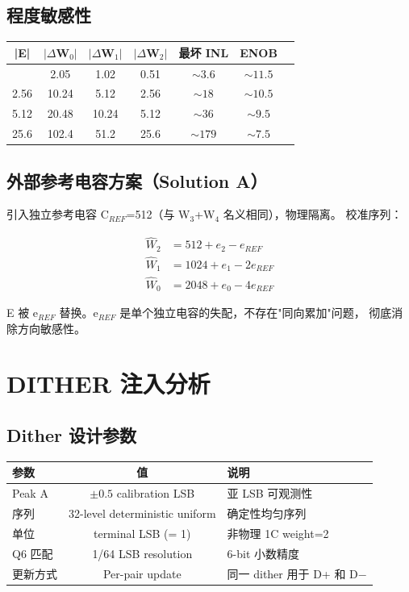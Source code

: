\documentclass[UTF8,a4paper,12pt]{ctexart}
\theoremstyle{definition}
\begin{document}
\subsection{程度敏感性}

\begin{longtable}{ccccccc}
\toprule
\textbf{|E|} & \textbf{$|\Delta$W$_0|$} & \textbf{$|\Delta$W$_1|$} & \textbf{$|\Delta$W$_2|$} & \textbf{最坏 INL} & \textbf{ENOB} \\
\midrule
\endhead
\bottomrule
\endfoot
0.512 & 2.05 & 1.02 & 0.51 & $\sim 3.6$ & $\sim 11.5$ \\
2.56 & 10.24 & 5.12 & 2.56 & $\sim 18$ & $\sim 10.5$ \\
5.12 & 20.48 & 10.24 & 5.12 & $\sim 36$ & $\sim 9.5$ \\
25.6 & 102.4 & 51.2 & 25.6 & $\sim 179$ & $\sim 7.5$ \\
\bottomrule
\end{longtable}

\subsection{外部参考电容方案（Solution A）}

引入独立参考电容 C$_{REF}$=512（与 W$_3$+W$_4$ 名义相同），物理隔离。
校准序列：

\begin{align*}
\hat W_2 &= 512 + e_2 - e_{REF} \\
\hat W_1 &= 1024 + e_1 - 2e_{REF} \\
\hat W_0 &= 2048 + e_0 - 4e_{REF}
\end{align*}

E 被 e$_{REF}$ 替换。e$_{REF}$ 是单个独立电容的失配，不存在"同向累加"问题，
彻底消除方向敏感性。

\section{DITHER 注入分析}

\subsection{Dither 设计参数}

\begin{longtable}{lcl}
\toprule
\textbf{参数} & \textbf{值} & \textbf{说明} \\
\midrule
\endhead
\bottomrule
\endfoot
Peak A & $\pm 0.5$ calibration LSB & 亚 LSB 可观测性 \\
序列 & 32-level deterministic uniform & 确定性均匀序列 \\
单位 & terminal LSB (= 1) & 非物理 1C weight=2 \\
Q6 匹配 & 1/64 LSB resolution & 6-bit 小数精度 \\
更新方式 & Per-pair update & 同一 dither 用于 D+ 和 D$-$ \\
\bottomrule
\end{longtable}
\end{document}
